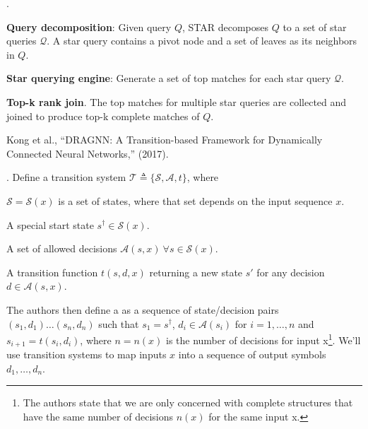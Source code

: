 \documentclass[11pt]{article}
\begin{document}
\myspace
\p {}. 
\begin{compactenum}
	\item \textbf{Query decomposition}: Given query $Q$, STAR decomposes $Q$ to a set of star queries $\mathcal Q$. A star query contains a pivot node and a set of leaves as its neighbors in $Q$. 
	
	\item \textbf{Star querying engine}: Generate a set of top matches for each star query $\mathcal Q$. 
	
	\item \textbf{Top-k rank join}. The top matches for multiple star queries are collected and joined to produce top-k complete matches of $Q$. 
\end{compactenum}









\vspace{-1em}
{\footnotesize Kong et al., ``DRAGNN: A Transition-based Framework for Dynamically Connected Neural Networks,'' (2017).}

\p {}. Define a transition system $\mathcal{T} \triangleq \{ \mathcal{S}, \mathcal{A}, t \}$, where
\begin{compactitem}
	\item $\mathcal{S} = \mathcal{S}(x)$ is a set of states, where that set depends on the input sequence $x$.
	\item A special start state $s^{\dagger} \in \mathcal{S}(x)$.
	\item A set of allowed decisions $\mathcal{A}(s, x) ~ \forall s \in \mathcal{S}(x)$.
	\item A transition function $t(s, d, x)$ returning a new state $s'$ for any decision $d \in \mathcal{A}(s, x)$.  
\end{compactitem}
The authors then define a  as a sequence of state/decision pairs $(s_1, d_1)\ldots(s_n, d_n)$ such that $s_1 = s^{\dagger}$, $d_i \in \mathcal{A}(s_i)$ for $i = 1, \ldots, n$ and $s_{i+1} = t(s_i, d_i)$, where $n = n(x)$ is the number of decisions for input x\footnote{The authors state that we are only concerned with complete structures that have the same number of decisions $n(x)$ for the same input x.}. We'll use transition systems to map inputs $x$ into a sequence of output symbols $d_1, \ldots, d_n$. 
\end{document}
